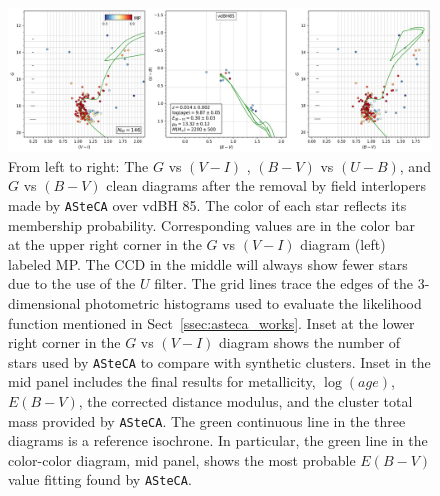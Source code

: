 \documentclass[draft]{aa}
\begin{document}
\begin{figure}[ht]
    \centering
    \includegraphics[width=\hsize]{../figs/cmds_vdBH85.png}
\caption{From left to right: The $G$ vs $(V-I)$ , $(B-V)$ vs $(U-B)$,
and $G$ vs $(B-V)$ clean diagrams after the removal by field interlopers
made by \texttt{ASteCA} over vdBH 85. The color of each star reflects
its membership probability. Corresponding values are in the color bar at
the upper right corner in the $G$ vs $(V-I)$ diagram (left) labeled
MP. The CCD in the middle will always show fewer stars due to the
use of the $U$ filter.
The grid lines trace the edges of the 3-dimensional photometric histograms used
to evaluate the likelihood function mentioned in Sect~\ref{ssec:asteca_works}.
Inset at the lower right corner in the $G$ vs $(V-I)$ diagram shows
the number of stars used by \texttt{ASteCA} to compare with synthetic clusters.
Inset in the mid panel includes the final
results for metallicity, $\log(age)$, $E(B-V)$, the corrected distance
modulus, and the cluster total mass provided by \texttt{ASteCA}. The green
continuous line in the three diagrams is a reference isochrone. In
particular, the green line in the color-color diagram, mid panel, shows the
most probable $E(B-V)$ value fitting found by \texttt{ASteCA}.
}
    \label{fig:fundpars_vdBH85}
\end{figure}
\end{document}

